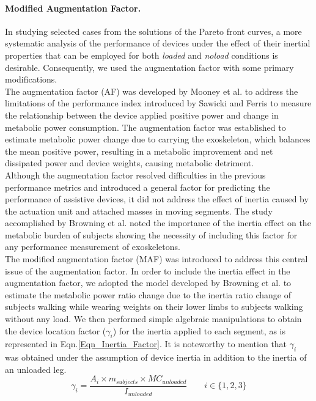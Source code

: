 \documentclass[10pt,letterpaper]{article}
\begin{document}
\paragraph*{Modified Augmentation Factor.} In studying selected cases from the solutions of the Pareto front curves, a more systematic analysis of the performance of devices under the effect of their inertial properties that can be employed for both {\it loaded} and {\it noload} conditions is desirable. Consequently, we used the augmentation factor \cite{41} with some primary modifications.\\
The augmentation factor (AF) was developed by Mooney et al. \cite{41} to address the limitations of the performance index introduced by Sawicki and Ferris \cite{149} to measure the relationship between the device applied positive power and change in metabolic power consumption. The augmentation factor was established to estimate metabolic power change due to carrying the exoskeleton, which balances the mean positive power, resulting in a metabolic improvement and net dissipated power and device weights, causing metabolic detriment.\\
Although the augmentation factor resolved difficulties in the previous performance metrics and introduced a general factor for predicting the performance of assistive devices, it did not address the effect of inertia caused by the actuation unit and attached masses in moving segments. The study accomplished by Browning et al. \cite{133} noted the importance of the inertia effect on the metabolic burden of subjects showing the necessity of including this factor for any performance measurement of exoskeletons.\\
The modified augmentation factor (MAF) was introduced to address this central issue of the augmentation factor. In order to include the inertia effect in the augmentation factor, we adopted the model developed by Browning et al. \cite {133} to estimate the metabolic power ratio change due to the inertia ratio change of subjects walking while wearing weights on their lower limbs to subjects walking without any load. We then performed simple algebraic manipulations to obtain the device location factor ($\gamma_{i}$) for the inertia applied to each segment, as is represented in Eqn.\eqref{Eqn_Inertia_Factor}. It is noteworthy to mention that $\gamma_{i}$ was obtained under the assumption of device inertia in addition to the inertia of an unloaded leg.
\begin{equation}\label{Eqn_Inertia_Factor}
\gamma_{i} = \frac{A_i\times m_{subjects}\times MC_{unloaded}}{I_{unloaded}} \qquad i \in \{1,2,3\}
\end{equation}
\end{document}
